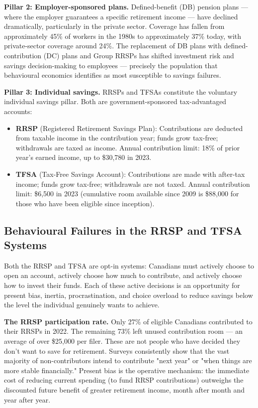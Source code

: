 \documentclass[12pt, letterpaper]{article}
\begin{document}
\textbf{Pillar 2: Employer-sponsored plans.} Defined-benefit (DB) pension plans --- where the employer guarantees a specific retirement income --- have declined dramatically, particularly in the private sector. Coverage has fallen from approximately 45\% of workers in the 1980s to approximately 37\% today, with private-sector coverage around 24\%. The replacement of DB plans with defined-contribution (DC) plans and Group RRSPs has shifted investment risk and savings decision-making to employees --- precisely the population that behavioural economics identifies as most susceptible to savings failures.

\textbf{Pillar 3: Individual savings.} RRSPs and TFSAs constitute the voluntary individual savings pillar. Both are government-sponsored tax-advantaged accounts:
\begin{itemize}
\item \textbf{RRSP} (Registered Retirement Savings Plan): Contributions are deducted from taxable income in the contribution year; funds grow tax-free; withdrawals are taxed as income. Annual contribution limit: 18\% of prior year's earned income, up to \$30,780 in 2023.
\item \textbf{TFSA} (Tax-Free Savings Account): Contributions are made with after-tax income; funds grow tax-free; withdrawals are not taxed. Annual contribution limit: \$6,500 in 2023 (cumulative room available since 2009 is \$88,000 for those who have been eligible since inception).
\end{itemize}


\subsection{Behavioural Failures in the RRSP and TFSA Systems}


Both the RRSP and TFSA are opt-in systems: Canadians must actively choose to open an account, actively choose how much to contribute, and actively choose how to invest their funds. Each of these active decisions is an opportunity for present bias, inertia, procrastination, and choice overload to reduce savings below the level the individual genuinely wants to achieve.

\textbf{The RRSP participation rate.} Only 27\% of eligible Canadians contributed to their RRSPs in 2022. The remaining 73\% left unused contribution room --- an average of over \$25,000 per filer. These are not people who have decided they don't want to save for retirement. Surveys consistently show that the vast majority of non-contributors intend to contribute "next year" or "when things are more stable financially." Present bias is the operative mechanism: the immediate cost of reducing current spending (to fund RRSP contributions) outweighs the discounted future benefit of greater retirement income, month after month and year after year.
\end{document}
